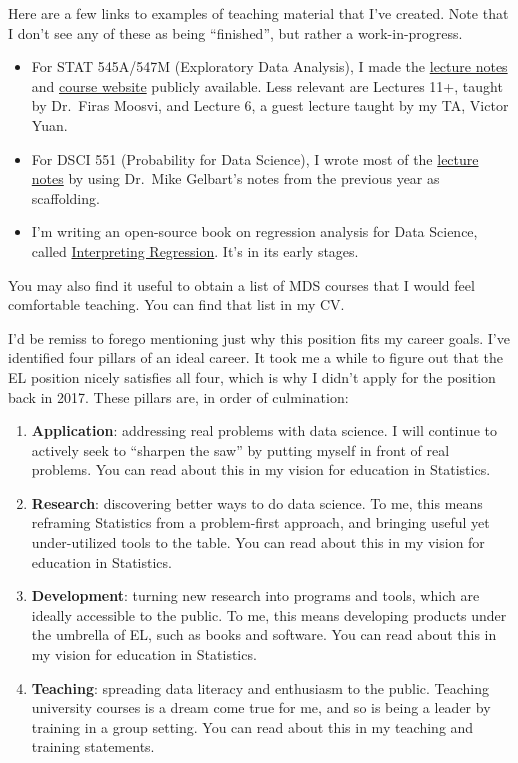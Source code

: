 \documentclass[]{article}
\providecommand{\tightlist}{%
  \setlength{\itemsep}{0pt}\setlength{\parskip}{0pt}}
\begin{document}
Here are a few links to examples of teaching material that I've created. Note that I don't see any of these as being ``finished'', but rather a work-in-progress.

\begin{itemize}
\tightlist
\item
  For STAT 545A/547M (Exploratory Data Analysis), I made the \href{https://stat545guidebook.netlify.com/}{lecture notes} and \href{https://stat545.stat.ubc.ca/}{course website} publicly available. Less relevant are Lectures 11+, taught by Dr.~Firas Moosvi, and Lecture 6, a guest lecture taught by my TA, Victor Yuan.
\item
  For DSCI 551 (Probability for Data Science), I wrote most of the \href{https://ubc-mds.github.io/DSCI_551_stat-prob-dsci/lectures/}{lecture notes} by using Dr.~Mike Gelbart's notes from the previous year as scaffolding.
\item
  I'm writing an open-source book on regression analysis for Data Science, called \href{https://interpreting-regression.netlify.com/}{Interpreting Regression}. It's in its early stages.
\end{itemize}

You may also find it useful to obtain a list of MDS courses that I would feel comfortable teaching. You can find that list in my CV.

I'd be remiss to forego mentioning just why this position fits my career goals. I've identified four pillars of an ideal career. It took me a while to figure out that the EL position nicely satisfies all four, which is why I didn't apply for the position back in 2017. These pillars are, in order of culmination:

\begin{enumerate}
\def\labelenumi{\arabic{enumi}.}
\tightlist
\item
  \textbf{Application}: addressing real problems with data science. I will continue to actively seek to ``sharpen the saw'' by putting myself in front of real problems. You can read about this in my vision for education in Statistics.
\item
  \textbf{Research}: discovering better ways to do data science. To me, this means reframing Statistics from a problem-first approach, and bringing useful yet under-utilized tools to the table. You can read about this in my vision for education in Statistics.
\item
  \textbf{Development}: turning new research into programs and tools, which are ideally accessible to the public. To me, this means developing products under the umbrella of EL, such as books and software. You can read about this in my vision for education in Statistics.
\item
  \textbf{Teaching}: spreading data literacy and enthusiasm to the public. Teaching university courses is a dream come true for me, and so is being a leader by training in a group setting. You can read about this in my teaching and training statements.
\end{enumerate}
\end{document}
